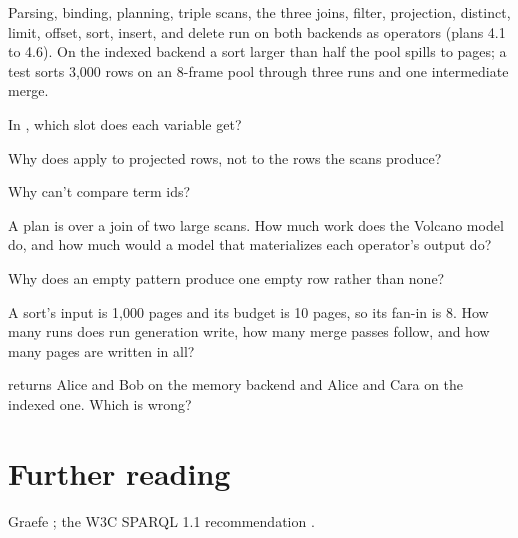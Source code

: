 \begin{status}
Parsing, binding, planning, triple scans, the three joins, filter,
projection, distinct, limit, offset, sort, insert, and delete run on both
backends as operators (plans 4.1 to 4.6). On the indexed backend a sort larger than half the pool spills to
pages; a test sorts 3,000 rows on an 8-frame pool through three runs and one
intermediate merge.
\end{status}

\begin{checkyourself}
\item In , which slot does each variable get?
\item Why does  apply to projected rows, not to the rows the scans produce?
\item Why can't  compare term ids?
\item A plan is  over a join of two large scans. How much work does the Volcano model do, and how much would a model that materializes each operator's output do?
\item Why does an empty pattern produce one empty row rather than none?
\item A sort's input is 1,000 pages and its budget is 10 pages, so its fan-in is 8. How many runs does run generation write, how many merge passes follow, and how many pages are written in all?
\item {} returns Alice and Bob on the memory backend and Alice and Cara on the indexed one. Which is wrong?
\end{checkyourself}

\section*{Further reading}
Graefe \cite{graefe}; the W3C SPARQL 1.1 recommendation \cite{sparql}.
